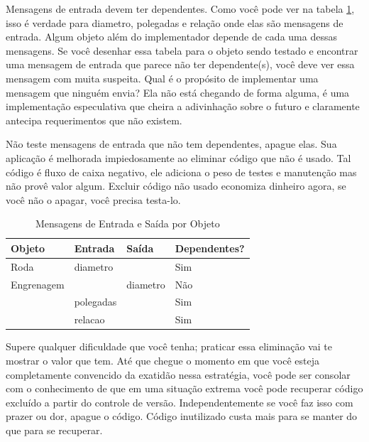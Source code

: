 Mensagens de entrada devem ter dependentes. Como você pode ver na tabela \ref{table:mensagens}, isso é verdade para diametro, polegadas e relação onde elas são mensagens de entrada. Algum objeto além do implementador depende de cada uma dessas mensagens.
Se você desenhar essa tabela para o objeto sendo testado e encontrar uma mensagem de entrada que parece não ter dependente(s), você deve ver essa mensagem com muita suspeita. Qual é o propósito de implementar uma mensagem que ninguém envia? Ela não está chegando de forma alguma, é uma implementação especulativa que cheira a adivinhação sobre o futuro e claramente antecipa requerimentos que não existem.

Não teste mensagens de entrada que não tem dependentes, apague elas. Sua aplicação é melhorada impiedosamente ao eliminar código que não é usado. Tal código é fluxo de caixa negativo, ele adiciona o peso de testes e manutenção mas não provê valor algum. Excluir código não usado economiza dinheiro agora, se você não o apagar, você precisa testa-lo.

\begin{table}[!htbp]
  \caption{Mensagens de Entrada e Saída por Objeto}
  \label{table:mensagens}
  \centering
  \begin{tabular}{p{3.0cm} | p{3.0cm} | p{3.0cm} | p{3.0cm}}
    \toprule
    \textbf{Objeto} & \textbf{Entrada} & \textbf{Saída} & \textbf{Dependentes?} \\ \midrule
    \small{Roda} & \small{diametro} & \small{} & \small{Sim} \\ \midrule
    \small{Engrenagem} & \small{} & \small{diametro} & \small{Não} \\ \midrule
    \small{} & \small{polegadas} & \small{} & \small{Sim} \\ \midrule
    \small{} & \small{relacao} & \small{} & \small{Sim}\\
    \bottomrule
  \end{tabular}
\end{table}

Supere qualquer dificuldade que você tenha; praticar essa eliminação vai te
mostrar o valor que tem. Até que chegue o momento em que você esteja completamente
convencido da exatidão nessa estratégia, você pode ser consolar com o conhecimento
de que em uma situação extrema você pode recuperar código excluído a partir do
controle de versão. Independentemente se você faz isso com prazer ou dor, apague
o código. Código inutilizado custa mais para se manter do que para se recuperar.


